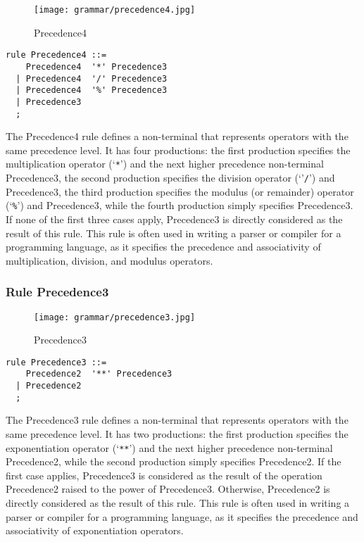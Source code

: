 \begin{figure}[!ht]
\centering
\texttt{[image: grammar/precedence4.jpg]}
\caption{Precedence4}
\end{figure}

\begin{lstlisting}
rule Precedence4 ::=
    Precedence4  '*' Precedence3 
  | Precedence4  '/' Precedence3 
  | Precedence4  '%' Precedence3 
  | Precedence3 
  ;
\end{lstlisting}

The Precedence4 rule defines a non-terminal that represents operators with the same precedence level. It has four productions: the first production specifies the multiplication operator (`\verb|*|') and the next higher precedence non-terminal Precedence3, the second production specifies the division operator (`'\verb|/|') and Precedence3, the third production specifies the modulus (or remainder) operator (`\verb|%|') and Precedence3, while the fourth production simply specifies Precedence3. If none of the first three cases apply, Precedence3 is directly considered as the result of this rule. This rule is often used in writing a parser or compiler for a programming language, as it specifies the precedence and associativity of multiplication, division, and modulus operators.

\subsubsection*{Rule Precedence3}

\begin{figure}[!ht]
\centering
\texttt{[image: grammar/precedence3.jpg]}
\caption{Precedence3}
\end{figure}

\begin{lstlisting}
rule Precedence3 ::=
    Precedence2  '**' Precedence3 
  | Precedence2 
  ;
\end{lstlisting}



The Precedence3 rule defines a non-terminal that represents operators with the same precedence level. It has two productions: the first production specifies the exponentiation operator (`\verb|**|') and the next higher precedence non-terminal Precedence2, while the second production simply specifies Precedence2. If the first case applies, Precedence3 is considered as the result of the operation Precedence2 raised to the power of Precedence3. Otherwise, Precedence2 is directly considered as the result of this rule. This rule is often used in writing a parser or compiler for a programming language, as it specifies the precedence and associativity of exponentiation operators.

